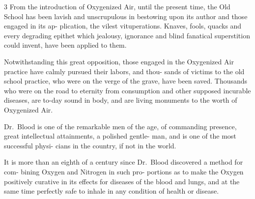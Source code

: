 \documentclass[10pt]{article}
\begin{document}
\begin{multicols}{3}
	From the introduction of Oxygenized Air,\linebreak
	until the present time, the Old School has\linebreak
	been lavish and unscrupulous in bestowing\linebreak
	upon its author and those engaged in its ap-\linebreak
	plication, the vilest vituperations. Knaves,\linebreak
	fools, quacks and every degrading epithet\linebreak
	which jealousy, ignorance and blind fanatical\linebreak
	superstition could invent, have been applied\linebreak
	to them.

	Notwithstanding this great opposition,\linebreak
	those engaged in the Oxygenized Air practice\linebreak
	have calmly pursued their labors, and thou-\linebreak
	sands of victims to the old school practice,\linebreak
	who were on the verge of the grave, have been\linebreak
	saved. Thousands who were on the road to\linebreak
	eternity from consumption and other supposed\linebreak
	incurable diseases, are to-day sound in body,\linebreak
	and are living monuments to the worth of\linebreak
	Oxygenized Air.

	Dr.~Blood is one of the remarkable men\linebreak
	of the age, of commanding presence, great\linebreak
	intellectual attainments, a polished gentle-\linebreak
	man, and is one of the most successful physi-\linebreak
	cians in the country, if not in the world.

	It is more than an eighth of a century\linebreak
	since Dr.~Blood discovered a method for com-\linebreak
	bining Oxygen and Nitrogen in such pro-\linebreak
	portions as to make the Oxygen positively curative in its effects
	for diseases\linebreak
	of the blood and lungs, and at the same time perfectly safe to
	inhale in any\linebreak
	condition of health or disease.


\end{multicols}
\end{document}

